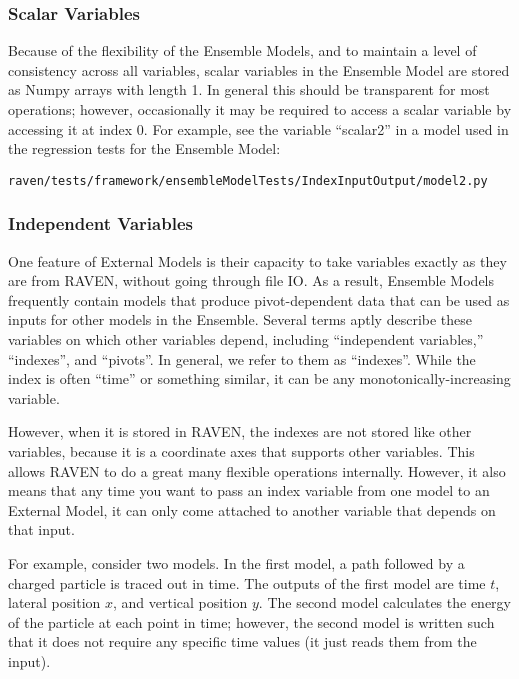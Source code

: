 \subsubsection{Scalar Variables}
Because of the flexibility of the Ensemble Models, and to maintain a level of consistency across all
variables, scalar variables in the Ensemble Model are stored as Numpy arrays with length 1.  In general this
should be transparent for most operations; however, occasionally it may be required to access a scalar
variable by accessing it at index 0.  For example, see the variable ``scalar2'' in a model used in the
regression tests for the Ensemble Model:
\begin{verbatim}
raven/tests/framework/ensembleModelTests/IndexInputOutput/model2.py
\end{verbatim}


\subsubsection{Independent Variables}
One feature of External Models is their capacity to take variables exactly as they are from RAVEN, without
going through file IO.  As a result, Ensemble Models frequently contain models that produce pivot-dependent data
that can be used as inputs for other models in the Ensemble. Several terms aptly describe these variables on
which other variables depend, including ``independent variables,'' ``indexes'', and ``pivots''.  In general,
we refer to them as ``indexes''.  While the index is often ``time'' or something
similar, it can be any monotonically-increasing variable.

However, when it is stored in RAVEN, the indexes are not stored like other variables,
because it is a coordinate axes that supports other variables.  This allows RAVEN to do a great many flexible
operations internally.  However, it also means that any time you want to pass an index variable from one model
to an External Model, it can only come attached to another variable that depends on that input.

For example, consider two models.  In the first model, a path followed by a charged particle is traced out in
time.  The outputs of the first model are time $t$, lateral position $x$, and vertical position $y$.  The
second model calculates the energy of the particle at each point in time; however, the second model is written
such that it does not require any specific time values (it just reads them from the input).

